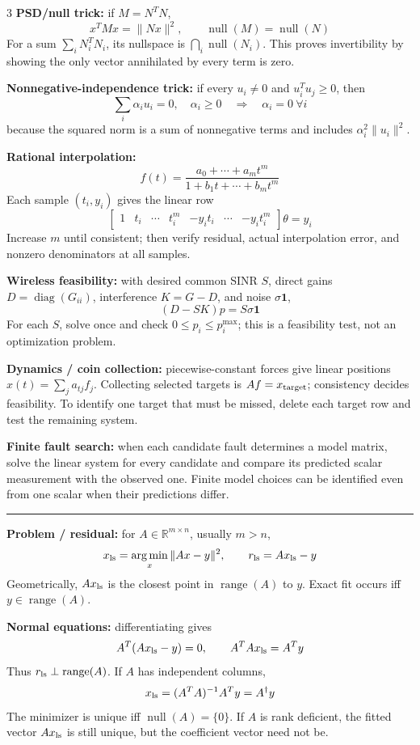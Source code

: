 \documentclass[10pt]{article}
\newcommand{\sect}[1]{\vspace{0.9pt}{\fontsize{7.2}{7.5}\selectfont\textbf{#1}}\vspace{0.25pt}\hrule\vspace{0.8pt}}
\newcommand{\sub}[1]{\textbf{#1}}
\newcommand{\R}{\mathbb{R}}
\newcommand{\range}{\operatorname{range}}
\newcommand{\nullsp}{\operatorname{null}}
\newcommand{\diag}{\operatorname{diag}}
\newcommand{\argmin}{\operatorname*{arg\,min}}
\newcommand{\one}{\mathbf{1}}
\begin{document}
\begin{multicols*}{3}
\sub{PSD/null trick:} if \(M=N^TN\),
\[
x^TMx=\|Nx\|^2,\qquad \nullsp(M)=\nullsp(N)
\]
For a sum \(\sum_iN_i^TN_i\), its nullspace is
\(\bigcap_i\nullsp(N_i)\). This proves invertibility by showing the only
vector annihilated by every term is zero.

\sub{Nonnegative-independence trick:} if every \(u_i\ne0\) and
\(u_i^Tu_j\ge0\), then
\[
\sum_i\alpha_iu_i=0,\quad\alpha_i\ge0
\quad\Rightarrow\quad \alpha_i=0\ \forall i
\]
because the squared norm is a sum of nonnegative terms and includes
\(\alpha_i^2\|u_i\|^2\).

\sub{Rational interpolation:}
\[
f(t)=\frac{a_0+\cdots+a_mt^m}{1+b_1t+\cdots+b_mt^m}
\]
Each sample \((t_i,y_i)\) gives the linear row
\[
\begin{bmatrix}
1&t_i&\cdots&t_i^m&-y_it_i&\cdots&-y_it_i^m
\end{bmatrix}\theta=y_i
\]
Increase \(m\) until consistent; then verify residual, actual interpolation
error, and nonzero denominators at all samples.

\sub{Wireless feasibility:} with desired common SINR \(S\), direct gains
\(D=\diag(G_{ii})\), interference \(K=G-D\), and noise \(\sigma\one\),
\[
(D-SK)p=S\sigma\one
\]
For each \(S\), solve once and check \(0\le p_i\le p_i^{\max}\); this is a
feasibility test, not an optimization problem.

\sub{Dynamics / coin collection:} piecewise-constant forces give linear
positions \(x(t)=\sum_j a_{tj}f_j\). Collecting selected targets is
\(Af=x_{\rm target}\); consistency decides feasibility. To identify one
target that must be missed, delete each target row and test the remaining
system.

\sub{Finite fault search:} when each candidate fault determines a model
matrix, solve the linear system for every candidate and compare its
predicted scalar measurement with the observed one. Finite model choices
can be identified even from one scalar when their predictions differ.

\sect{Least Squares (Lecture 10)}
\sub{Problem / residual:} for \(A\in\R^{m\times n}\), usually \(m>n\),
\[
x_{\rm ls}=\argmin_x\|Ax-y\|^2,\qquad r_{\rm ls}=Ax_{\rm ls}-y
\]
Geometrically, \(Ax_{\rm ls}\) is the closest point in \(\range(A)\) to
\(y\). Exact fit occurs iff \(y\in\range(A)\).

\sub{Normal equations:} differentiating gives
\[
A^T(Ax_{\rm ls}-y)=0,\qquad A^TAx_{\rm ls}=A^Ty
\]
Thus \(r_{\rm ls}\perp\range(A)\). If \(A\) has independent columns,
\[
x_{\rm ls}=(A^TA)^{-1}A^Ty=A^\dagger y
\]
The minimizer is unique iff \(\nullsp(A)=\{0\}\). If \(A\) is rank
deficient, the fitted vector \(Ax_{\rm ls}\) is still unique, but the
coefficient vector need not be.


\end{multicols*}
\end{document}
